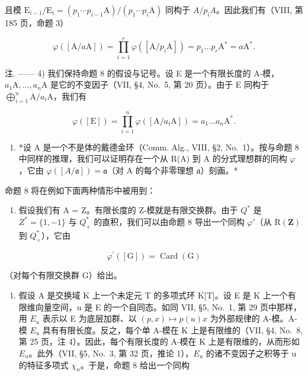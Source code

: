且模 \(\mathrm{E}_{i-1}/\mathrm{E}_{i}=(p_{1}\cdots p_{i-1}\mathrm{A})/(p_{1}\cdots p_{i}\mathrm{A})\) 同构于 \(A/p_{i}A\)。因此我们有（VIII, 第 185 页，命题 3）

\[
\varphi ([ \mathrm{A} / a \mathrm{A} ]) = \prod_ {i = 1} ^ {r} \varphi ([ \mathrm{A} / p _ {i} \mathrm{A} ]) = p _ {1} \dots p _ {r} \mathrm{A} ^ {*} = a \mathrm{A} ^ {*}.
\]

注. —— 4) 我们保持命题 8 的假设与记号。设 E 是一个有限长度的 A-模，\(a_{1}\mathrm{A},\ldots ,a_{n}\mathrm{A}\) 是它的不变因子（VII, §4, No.~5, 第 20 页）。由于 E 同构于 \(\bigoplus_{i = 1}^{n}\mathrm{A} / a_i\mathrm{A}\)，我们有

\[
\varphi ([ \mathrm{E} ]) = \prod_ {i = 1} ^ {n} \varphi ([ \mathrm{A} / a _ {i} \mathrm{A} ]) = a _ {1} \dots a _ {n} \mathrm{A} ^ {*}.\tag{10}
\]

\begin{enumerate}
\def\labelenumi{\arabic{enumi})}
\setcounter{enumi}{4}
\tightlist
\item
  *设 A 是一个不是体的戴德金环（Comm. Alg., VIII, §2, No.~1）。按与命题 8 中同样的推理，我们可以证明存在一个从 R(A) 到 A 的分式理想群的同构 \(\varphi\)，它由 \(\varphi([A/\mathfrak{a}]) = \mathfrak{a}\)（对 A 的每个非零理想 \(\mathfrak{a}\)）刻画。*
\end{enumerate}

命题 8 将在例如下面两种情形中被用到：

\begin{enumerate}
\def\labelenumi{\alph{enumi})}
\tightlist
\item
  假设我们有 A = Z。有限长度的 Z-模就是有限交换群。由于 \(Q^{*}\) 是 \(Z^{*} = \{1, -1\}\) 与 \(Q_{+}^{*}\) 的直积，我们可以由命题 8 导出一个同构 \(\varphi'\)（从 \(\mathrm{R}(\mathbf{Z})\) 到 \(Q_{+}^{*}\)），它由
\end{enumerate}

\[
\varphi^ {\prime} ([ \mathrm{G} ]) = \operatorname{Card} (\mathrm{G})
\]

（对每个有限交换群 G）给出。

\begin{enumerate}
\def\labelenumi{\alph{enumi})}
\setcounter{enumi}{1}
\tightlist
\item
  假设 A 是交换域 K 上一个未定元 T 的多项式环 K{[}T{]}。设 E 是 K 上一个有限维向量空间，u 是 E 的一个自同态。如同 VII, §5, No.~1, 第 29 页中那样，用 \(E_{u}\) 表示以 E 为底层加群、以 \((p, x) \mapsto p(u)x\) 为外部规律的 A-模。A-模 \(E_{u}\) 具有有限长度。反之，每个单 A-模在 K 上是有限维的（VII, §4, No.~8, 第 25 页，注 4）。因此，每个有限长度的 A-模在 K 上是有限维的，从而形如 \(E_{u}\)。此外（VII, §5, No.~3, 第 32 页，推论 1），\(E_{u}\) 的诸不变因子之积等于 u 的特征多项式 \(\chi_{u}\)。于是，命题 8 给出一个同构
\end{enumerate}


